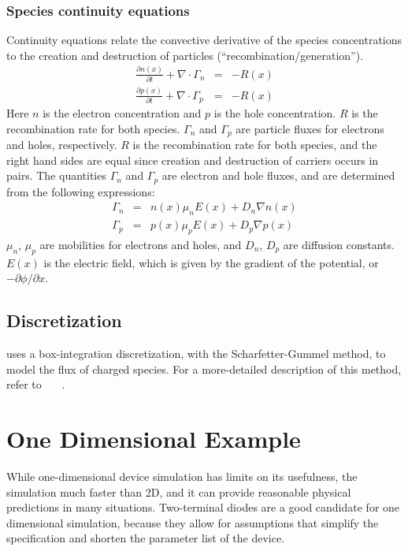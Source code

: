 \subsubsection{Species continuity equations}
Continuity equations relate the convective derivative of the species
concentrations to the creation and destruction of particles
(``re\-com\-bin\-ation/gen\-er\-ation'').
\begin{eqnarray}
  \label{eqn:hd-cont1}
  \frac{\partial n(x)}{\partial t} + \nabla \cdot \Gamma_n &=& - R(x)\\
  \label{eqn:hd-cont2}
  \frac{\partial p(x)}{\partial t} + \nabla \cdot \Gamma_p &=& - R(x)
\end{eqnarray}
Here $n$ is the electron concentration and $p$ is the hole concentration. $R$
is the recombination rate for both species.  $\Gamma_n$ and $\Gamma_p$ are
particle fluxes for electrons and holes, respectively.  
$R$ is the recombination rate for both species, and the right hand sides are equal since
creation and destruction of carriers occurs in pairs.
The quantities $\Gamma_n$ and $\Gamma_p$ are electron and hole fluxes, and 
are determined from the following expressions:
\begin{eqnarray}
  \Gamma_n &=& n(x)\mu_n E(x) + D_n \nabla n(x)\\
  \Gamma_p &=& p(x)\mu_p E(x) + D_p \nabla p(x)
\end{eqnarray}
$\mu_n$, $\mu_p$ are mobilities for electrons and holes, and $D_n$, $D_p$
are diffusion constants. $E(x)$ is the electric field, which is given by
the gradient of the potential, or $-\partial \phi/\partial x$.

\subsection{Discretization}
\Xyce{} uses a box-integration discretization, with the Scharfetter-Gummel
method, to model the flux of charged species.  For a more-detailed description of this method, refer to ~\cite{Kramer}~\cite{selberherr}~\cite{Xyce_PDE_LDRD}.

\section{One Dimensional Example} \label{PDE_One_D_Example}
While one-dimensional device simulation has limits on its usefulness, the
simulation much faster than 2D, and it can provide reasonable physical
predictions in many situations. Two-terminal diodes are a good candidate for
one dimensional simulation, because they allow for assumptions that simplify
the specification and shorten the parameter list of the device.

